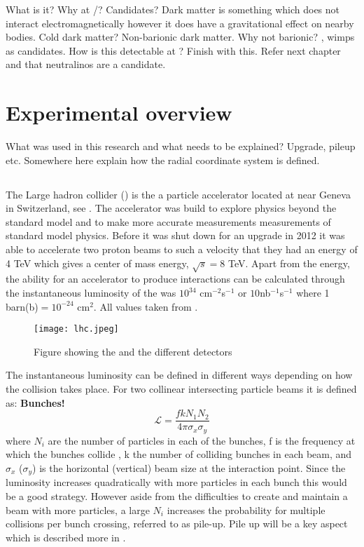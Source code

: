 What is it? Why at \abbrCERN/\abbrATLAS? Candidates?
Dark matter is something which does not interact electromagnetically however it does have a gravitational effect on nearby bodies.
Cold dark matter?
Non-barionic dark matter. Why not barionic?
\abbrWIMPS, wimps as candidates.
How is this detectable at \abbrATLAS? Finish with this. Refer next chapter and that neutralinos are a candidate.

\newpage
\section{Experimental overview}\label{sec:experiment}
What was used in this research and what needs to be explained? Upgrade, pileup etc.
Somewhere here explain how the radial coordinate system is defined.
\subsection{\abbrLHC}
The Large hadron collider (\abbrLHC) is the a particle accelerator located at \abbrCERN near Geneva in Switzerland, see . The accelerator was build to explore physics beyond the standard model and to make more accurate measurements measurements of standard model physics. Before it was shut down for an upgrade in 2012 it was able to accelerate two proton beams to such a velocity that they had an energy of 4 TeV which gives a center of mass energy, $\sqrt{s}=8$ TeV. Apart from the energy, the ability for an accelerator to produce interactions can be calculated through the instantaneous luminosity of the \abbrLHC was $10^{34}$ cm$^{-2}$s$^{-1}$ or $10$nb$^{-1}$s$^{-1}$ where 1 barn(b)$=10^{-24}$ cm$^2$. All values taken from \citep{lumires}.
\begin{figure}[H]
\begin{center}
\texttt{[image: lhc.jpeg]}
\caption{Figure showing the \abbrLHC and the different detectors\citep{lhcimage}}
\label{fig:lhc}
\end{center}
\end{figure}
The instantaneous luminosity can be defined in different ways depending on how the collision takes place. For two collinear intersecting particle beams it is defined as:
\textbf{Bunches!}
\begin{equation}
\mathscr{L} = \frac{fkN_1 N_2}{4\pi \sigma_x \sigma_y}
\end{equation}
where $N_i$ are the number of particles in each of the bunches, f is the frequency at which the bunches collide , k the number of colliding bunches in each beam, and $\sigma_x$ ($\sigma_y$) is the horizontal (vertical) beam size at the interaction point. Since the luminosity increases quadratically with more particles in each bunch this would be a good strategy. However aside from the difficulties to create and maintain a beam with more particles, a large $N_i$ increases the probability for multiple collisions per bunch crossing, referred to as pile-up. Pile up will be a key aspect which is described more in . 

